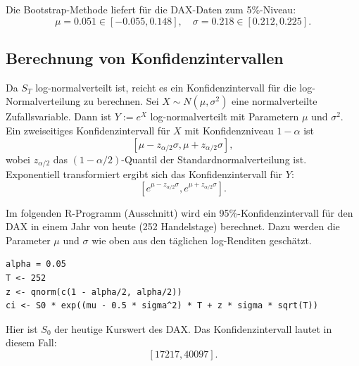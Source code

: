 Die Bootstrap-Methode liefert für die DAX-Daten zum 5\%-Niveau:
$$\mu = 0.051 \in [-0.055, 0.148], \quad \sigma = 0.218 \in [0.212, 0.225].$$

\subsection{Berechnung von Konfidenzintervallen}

Da $S_T$ log-normalverteilt ist, reicht es ein Konfidenzintervall für die log-Normalverteilung
zu berechnen.
Sei $X \sim N(\mu, \sigma^2)$ eine normalverteilte Zufallsvariable.
Dann ist $Y := e^X$ log-normalverteilt mit Parametern $\mu$ und $\sigma^2$.
Ein zweiseitiges Konfidenzintervall für $X$ mit Konfidenzniveau $1-\alpha$ ist
$$[\mu - z_{\alpha/2} \sigma, \mu + z_{\alpha/2} \sigma],$$
wobei $z_{\alpha/2}$ das $(1-\alpha/2)$-Quantil der Standardnormalverteilung ist.
Exponentiell transformiert ergibt sich das Konfidenzintervall für $Y$:
$$[e^{\mu - z_{\alpha/2} \sigma}, e^{\mu + z_{\alpha/2} \sigma}].$$

\begin{bsp}

Im folgenden R-Programm (Ausschnitt) wird ein 95\%-Konfidenzintervall für den DAX in einem Jahr von heute (252 Handelstage) berechnet.
Dazu werden die Parameter $\mu$ und $\sigma$ wie oben aus den täglichen log-Renditen geschätzt.

\begin{lstlisting}
alpha = 0.05
T <- 252
z <- qnorm(c(1 - alpha/2, alpha/2))
ci <- S0 * exp((mu - 0.5 * sigma^2) * T + z * sigma * sqrt(T))
\end{lstlisting}

Hier ist $S_0$ der heutige Kurswert des DAX. Das Konfidenzintervall lautet in diesem Fall:
$$[17217, 40097].$$

\end{bsp}


